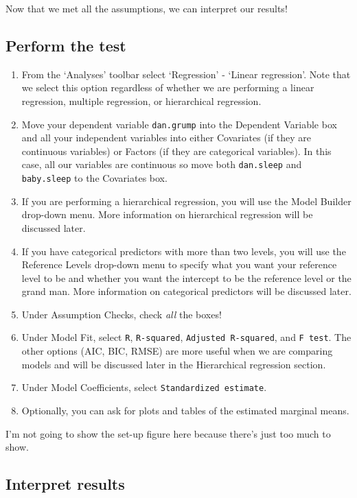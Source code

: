 \documentclass[
]{book}
\begin{document}
Now that we met all the assumptions, we can interpret our results!

\hypertarget{perform-the-test-10}{%
\subsection{Perform the test}\label{perform-the-test-10}}

\begin{enumerate}
\def\labelenumi{\arabic{enumi}.}
\item
  From the `Analyses' toolbar select `Regression' - `Linear regression'. Note that we select this option regardless of whether we are performing a linear regression, multiple regression, or hierarchical regression.
\item
  Move your dependent variable \texttt{dan.grump} into the Dependent Variable box and all your independent variables into either Covariates (if they are continuous variables) or Factors (if they are categorical variables). In this case, all our variables are continuous so move both \texttt{dan.sleep} and \texttt{baby.sleep} to the Covariates box.
\item
  If you are performing a hierarchical regression, you will use the Model Builder drop-down menu. More information on hierarchical regression will be discussed later.
\item
  If you have categorical predictors with more than two levels, you will use the Reference Levels drop-down menu to specify what you want your reference level to be and whether you want the intercept to be the reference level or the grand man. More information on categorical predictors will be discussed later.
\item
  Under Assumption Checks, check \emph{all} the boxes!
\item
  Under Model Fit, select \texttt{R}, \texttt{R-squared}, \texttt{Adjusted\ R-squared}, and \texttt{F\ test}. The other options (AIC, BIC, RMSE) are more useful when we are comparing models and will be discussed later in the Hierarchical regression section.
\item
  Under Model Coefficients, select \texttt{Standardized\ estimate}.
\item
  Optionally, you can ask for plots and tables of the estimated marginal means.
\end{enumerate}

I'm not going to show the set-up figure here because there's just too much to show.

\hypertarget{interpret-results-6}{%
\subsection{Interpret results}\label{interpret-results-6}}
\end{document}
